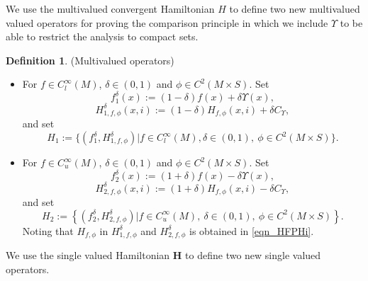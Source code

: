 \documentclass[a4paper]{article}
\numberwithin{equation}{section}
\theoremstyle{definition}
\newtheorem{definition}[theorem]{Definition}
\begin{document}
We use the multivalued convergent Hamiltonian $H$ to define two new multivalued valued operators for proving the comparison principle in which we include $\Upsilon$ to be able to restrict the analysis to compact sets.
\begin{definition}(Multivalued operators)
\begin{itemize}
\item For $f\in C^{\infty}_l(M)$, $\delta\in(0,1)$ and $\phi\in C^2(M\times S)$. Set
\begin{equation*}
f^{\delta}_1(x):=(1-\delta)f(x)+\delta \Upsilon(x),
\end{equation*}
\begin{equation*}
H^\delta_{1,f,\phi}(x,i):=(1-\delta)H_{f,\phi}(x,i)+\delta C_{\Upsilon},
\end{equation*}
and set
\begin{equation*}
H_1:=\Big\{\left(f^{\delta}_1,H^\delta_{1,f,\phi}\right)\Big | f\in C^{\infty}_l(M),\delta\in(0,1),~\phi\in C^2(M\times S)\Big\}.
\end{equation*}
\item For $f\in C^{\infty}_u(M)$, $\delta\in(0,1)$ and $\phi\in C^2(M\times S)$. Set
\begin{equation*}
f^{\delta}_2(x):=(1+\delta)f(x)-\delta \Upsilon(x),
\end{equation*}
\begin{equation*}
H^\delta_{2,f,\phi}(x,i):=(1+\delta)H_{f,\phi}(x,i)-\delta C_\Upsilon,
\end{equation*}
and set
\begin{equation*}
H_2:=\left\{\left(f^{\delta}_2,H^\delta_{2,f,\phi}\right)\Big | f\in C^{\infty}_u(M),~\delta\in(0,1),~\phi\in C^2(M\times S)\right\}.
\end{equation*}
Noting that $H_{f,\phi}$ in $H_{1,f,\phi}^\delta$ and $H_{2,f,\phi}^\delta$ is obtained in \eqref{eqn_HFPHi}.
\end{itemize}
\end{definition}
We use the single valued Hamiltonian $\mathbf{H}$ to define two new single valued operators. 
\end{document}
